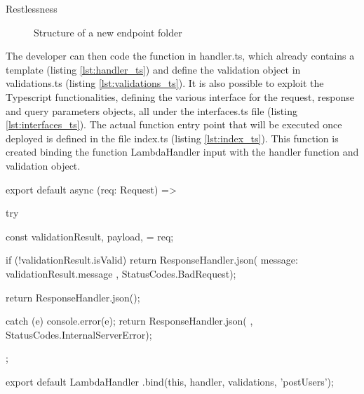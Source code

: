 \begin{chapter}{Restlessness}
    \begin{figure}
        \begin{minipage}{\linewidth}
        \end{minipage}
        \caption{Structure of a new endpoint folder}
        \label{fig:new_endpoint_folder_structure}
    \end{figure}

    The developer can then code the function in handler.ts, which already contains a
    template (listing \ref{lst:handler_ts}) and define the validation object in
    validations.ts (listing \ref{lst:validations_ts}).
    It is also possible to exploit the Typescript functionalities, defining the various
    interface for the request, response and query parameters objects, all under the
    interfaces.ts file (listing \ref{lst:interfaces_ts}).
    The actual function entry point that will be executed once deployed is defined
    in the file index.ts (listing \ref{lst:index_ts}). This function is created binding
    the function LambdaHandler input with the handler function and validation object.

    \clearpage

    \begin{code}[caption=handler.ts content, label={lst:handler_ts}]
export default async (req: Request) => {
  try {
    const {
        validationResult,
        payload,
    } = req;

    if (!validationResult.isValid) {
        return ResponseHandler.json({
            message: validationResult.message
        }, StatusCodes.BadRequest);
    }

    return ResponseHandler.json({});
  } catch (e) {
    console.error(e);
    return ResponseHandler.json(
        {}, StatusCodes.InternalServerError);
  }
};
    \end{code}

    \bigskip
    \begin{code}[caption=index.ts content, label={lst:index_ts}]
export default LambdaHandler
    .bind(this, handler, validations, 'postUsers');
    \end{code}


\end{chapter}
